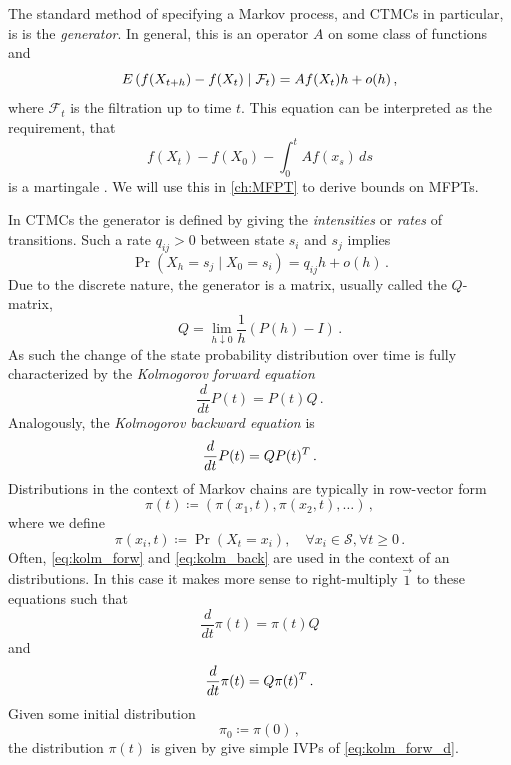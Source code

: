 The standard method of specifying a Markov process, and \acp{CTMC} in particular, is
is the \emph{generator}.
In general, this is an operator $A$ on some class of functions and
\begin{equation}\label{eq:generator}
	{E}\left(f(X_{t+h}) - f(X_t)\mid \mathcal{F}_t\right)
	=
	Af(X_t)h + o(h)\,,
\end{equation}
where $\mathcal{F}_t$ is the filtration up to time $t$.
This equation can be interpreted as the requirement, that
\[f(X_t) - f(X_0) - \int_0^t Af(x_s)\,ds\] is a martingale \cite[p.~5]{kurtz1981approximation}.
We will use this in \autoref{ch:MFPT} to derive bounds on \aclp{MFPT}.

In \acp{CTMC} the generator is defined by giving the \emph{intensities} or \emph{rates}
of transitions.
Such a rate $q_{ij} > 0$ between state $s_i$ and $s_j$ implies
\begin{equation}
	\Pr(X_{h} = s_j\mid X_0=s_i) = q_{ij}h + o(h)\,.
\end{equation}
Due to the discrete nature, the generator is a matrix, usually called the $Q$-matrix,
\begin{equation}
	Q = \lim_{h\downarrow 0}\frac{1}{h}\left(P(h) - I\right)\,.
\end{equation}
As such the change of the state probability distribution over time is fully characterized by the \emph{Kolmogorov forward equation}
\begin{equation}\label{eq:kolm_forw}
	\frac{d}{dt}P(t) = P(t)Q\,.
\end{equation}
Analogously, the \emph{Kolmogorov backward equation} is
\begin{equation}\label{eq:kolm_back}
	\frac{d}{dt}P(t) = QP(t)^{T}\,.
\end{equation}
Distributions in the context of Markov chains are typically in row-vector form
\[
\pi(t)\coloneqq(\pi(x_1, t), \pi(x_2, t), \dots)\,,
\]
where we define
\[
\pi(x_i, t)\coloneqq \Pr(X_t=x_i), \quad\forall x_i\in\mathcal{S}, \forall{t\geq 0}\,.
\]
Often, \eqref{eq:kolm_forw} and \eqref{eq:kolm_back} are used in the context of an
distributions.
In this case it makes more sense to right-multiply $\vec{1}$ to these equations such
that
\begin{equation}\label{eq:kolm_forw_d}
	\frac{d}{dt}\pi(t) = \pi(t)Q
\end{equation}
and
\begin{equation}\label{eq:kolm_back_d}
	\frac{d}{dt}\pi(t) = Q\pi(t)^{T}\,.
\end{equation}
Given some initial distribution
\[
\pi_0 \coloneqq \pi(0)\,,
\]
the distribution $\pi(t)$ is given by give simple \acp{IVP} of \eqref{eq:kolm_forw_d}.

